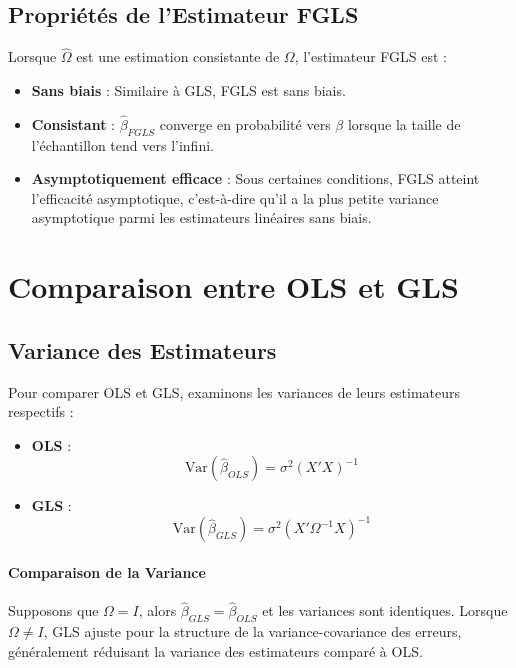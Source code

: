 \documentclass[14pt]{extarticle} %
\theoremstyle{definition}
\theoremstyle{plain}
\begin{document}
\subsection{Propriétés de l'Estimateur FGLS}

Lorsque \( \hat{\Omega} \) est une estimation consistante de \( \Omega \), l'estimateur FGLS est :
\begin{itemize}
    \item \textbf{Sans biais} : Similaire à GLS, FGLS est sans biais.
    \item \textbf{Consistant} : \(\hat{\beta}_{FGLS}\) converge en probabilité vers \(\beta\) lorsque la taille de l'échantillon tend vers l'infini.
    \item \textbf{Asymptotiquement efficace} : Sous certaines conditions, FGLS atteint l'efficacité asymptotique, c'est-à-dire qu'il a la plus petite variance asymptotique parmi les estimateurs linéaires sans biais.
\end{itemize}

\section{Comparaison entre OLS et GLS}

\subsection{Variance des Estimateurs}

Pour comparer OLS et GLS, examinons les variances de leurs estimateurs respectifs :
\begin{itemize}
    \item \textbf{OLS} :
    \[
    \text{Var}(\hat{\beta}_{OLS}) = \sigma^2 (X'X)^{-1}
    \]
    \item \textbf{GLS} :
    \[
    \text{Var}(\hat{\beta}_{GLS}) = \sigma^2 (X' \Omega^{-1} X)^{-1}
    \]
\end{itemize}

\paragraph{Comparaison de la Variance}

Supposons que \( \Omega = I \), alors \( \hat{\beta}_{GLS} = \hat{\beta}_{OLS} \) et les variances sont identiques. Lorsque \( \Omega \neq I \), GLS ajuste pour la structure de la variance-covariance des erreurs, généralement réduisant la variance des estimateurs comparé à OLS.
\end{document}
